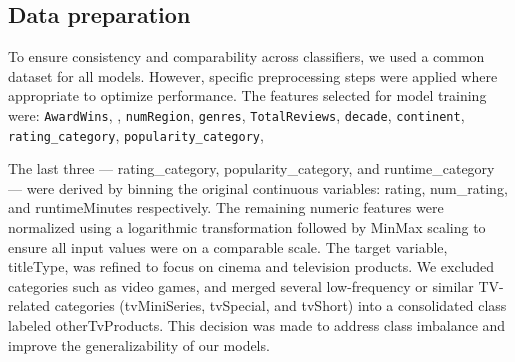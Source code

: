 \documentclass[10pt]{article}
\begin{document}
\subsection{Data preparation}
To ensure consistency and comparability across classifiers, we used a common dataset for all models. However, specific preprocessing steps were applied where appropriate to optimize performance. \newline
The features selected for model training were: \texttt{AwardWins}, \texttt{}, \texttt{numRegion}, \texttt{genres}, \texttt{TotalReviews}, \texttt{decade}, \texttt{continent}, \texttt{rating\_category}, \texttt{popularity\_category}, \newline
\texttt{}

The last three — rating\_category, popularity\_category, and runtime\_category — were derived by binning the original continuous variables: rating, num\_rating, and runtimeMinutes respectively. The remaining numeric features were normalized using a logarithmic transformation followed by MinMax scaling to ensure all input values were on a comparable scale. \newline
The target variable, titleType, was refined to focus on cinema and television products. We excluded categories such as video games, and merged several low-frequency or similar TV-related categories (tvMiniSeries, tvSpecial, and tvShort) into a consolidated class labeled otherTvProducts. This decision was made to address class imbalance and improve the generalizability of our models.
\end{document}
